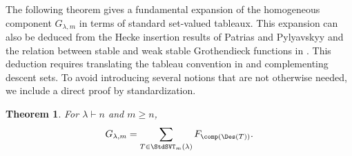 \documentclass[12pt, reqno]{amsart}
\numberwithin{equation}{section}
\numberwithin{figure}{section}
\numberwithin{table}{section}
\newtheorem{theorem}{Theorem}[section]
\theoremstyle{definition}
\begin{document}
The following theorem gives a fundamental expansion of the homogeneous component $G_{\lambda,m}$ in terms of standard set-valued tableaux.
This expansion can also be deduced from the Hecke insertion results of Patrias and Pylyavskyy \cite[Theorems~6.17 and 6.19]{PP16} and the relation between stable and weak stable Grothendieck functions in \cite[Proposition~9.22]{LP07}.
This deduction requires translating the tableau convention in \cite[Remark~6.10]{PP16} and complementing descent sets.
To avoid introducing several notions that are not otherwise needed, we include a direct proof by standardization.


\begin{theorem}\label{thm: stable groth F expansion}
For $\lambda \vdash n$ and $m\ge n$,
\begin{equation}\label{eq: stable groth F expansion}
G_{\lambda,m}
=\sum_{T\in \StdSVT_m(\lambda)}
F_{\comp(\Des(T))}.
\end{equation}
\end{theorem}
\end{document}

